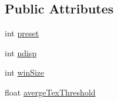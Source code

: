 \subsection*{Public Attributes}
\begin{DoxyCompactItemize}
\item 
int \hyperlink{classcv_1_1gpu_1_1StereoBM__GPU_a82683f26180823d2e8480b1deecff658}{preset}
\item 
int \hyperlink{classcv_1_1gpu_1_1StereoBM__GPU_aec33b952759ff2881ae7267598bc8097}{ndisp}
\item 
int \hyperlink{classcv_1_1gpu_1_1StereoBM__GPU_a1d849fcce4681317150454fbd685dbc8}{win\-Size}
\item 
float \hyperlink{classcv_1_1gpu_1_1StereoBM__GPU_a3b57fc867865800b50524725de81cdd4}{averge\-Tex\-Threshold}
\end{DoxyCompactItemize}


